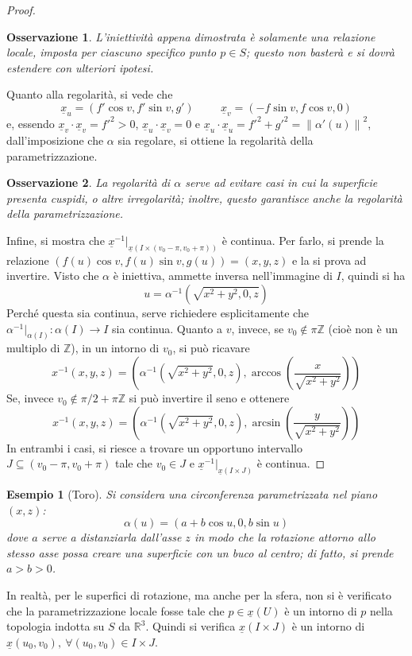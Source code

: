 \documentclass[12pt]{scrartcl}
\theoremstyle{style}
\newtheorem{esempio}{Esempio}[section]
\newtheorem{osservazione}{Osservazione}[section]
\numberwithin{equation}{subsection}
\begin{document}
\begin{proof}
	\begin{osservazione}
	L'iniettivit\`a appena dimostrata \`e solamente una relazione locale, imposta per ciascuno specifico punto $p \in S$; questo non baster\`a e si dovr\`a estendere con ulteriori ipotesi.
	\end{osservazione}
	\noindent Quanto alla regolarit\`a, si vede che
	\[
	\underline{x}_u = (f ' \cos v, f ' \sin v , g') \hspace{1cm} \underline{x}_v = (-f \sin v , f \cos v , 0)
	\] 
	e, essendo $\underline{x}_v \cdot \underline{x}_v = f'^2 > 0$, $\underline{x}_u \cdot \underline{x}_v =0$ e $\underline{x}_u \cdot  \underline{x}_u = f'^2 + g'^2 = \left\lVert \alpha '(u) \right\rVert ^2$, dall'imposizione che $\alpha $ sia regolare, si ottiene la regolarit\`a della parametrizzazione.
	\begin{osservazione}
	La regolarit\`a di $\alpha $ serve ad evitare casi in cui la superficie presenta cuspidi, o altre irregolarit\`a; inoltre, questo garantisce anche la regolarit\`a della parametrizzazione.
	\end{osservazione}
	\noindent Infine, si mostra che $\underline{x}^{-1}|_{\underline{x}(I \times (v_0-\pi,v_0+\pi))}  $ \`e continua.
	Per farlo, si prende la relazione $(f(u) \cos v , f(u) \sin v, g(u)) = (x,y,z)$ e la si prova ad invertire.
	Visto che $\alpha $ \`e iniettiva, ammette inversa nell'immagine di $I$, quindi si ha
	\[
	u = \alpha ^{-1}\left(\sqrt{x^2 + y^2 , 0 , z}\right) 
	\] 
	Perch\'e questa sia continua, serve richiedere esplicitamente che $\alpha ^{-1}|_{\alpha (I)} : \alpha (I) \to I$ sia continua.
	Quanto a $v$, invece, se $v_0 \not \in \pi \mathbb{Z}$ (cio\`e non \`e un multiplo di $\mathbb{Z}$), in un intorno di $v_0$, si pu\`o ricavare
	\[
	x^{-1}(x,y,z) = \left(\alpha ^{-1}\left(\sqrt{x^2 + y^2 } ,0,z\right)  , \arccos \left(\frac{x}{\sqrt{x^2 + y^2} }\right) \right) 
	\] 
	Se, invece $v_0 \not \in \pi / 2 + \pi \mathbb{Z}$ si pu\`o invertire il seno e ottenere
	\[
	x^{-1}(x,y,z) = \left(\alpha ^{-1}\left(\sqrt{x^2 + y^2 } ,0,z\right)  , \arcsin \left(\frac{y}{\sqrt{x^2 + y^2} }\right) \right) 
	\] 
	In entrambi i casi, si riesce a trovare un opportuno intervallo $J \subseteq (v_0 - \pi  , v_0+\pi)$ tale che $v_0 \in J$ e $\underline{x}^{-1}|_{\underline{x}(I \times J)} $ \`e continua.
\end{proof}
\begin{esempio}
	[Toro]
	Si considera una circonferenza parametrizzata nel piano $(x,z)$:
	\[
	\alpha (u) = (a + b\cos u , 0 , b \sin u)
	\] 
	dove $a$ serve a distanziarla dall'asse $z$ in modo che la rotazione attorno allo stesso asse possa creare una superficie con un buco al centro; di fatto, si prende $a > b > 0$.
\end{esempio}
\noindent In realt\`a, per le superfici di rotazione, ma anche per la sfera, non si \`e verificato che la parametrizzazione locale fosse tale che $p \in \underline{x}(U)$ \`e un intorno di $p$ nella topologia indotta su $S$ da $\mathbb{R}^3$.
Quindi si verifica $\underline{x}(I\times J)$ \`e un intorno di $\underline{x}(u_0,v_0), \ \forall (u_0,v_0) \in I \times J$.
\end{document}
